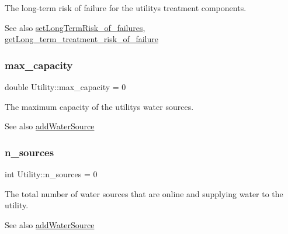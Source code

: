 The long-\/term risk of failure for the utility\textquotesingle{}s treatment components. 

\begin{DoxySeeAlso}{See also}
\mbox{\hyperlink{classUtility_a0a5ccfc2e606ef46f1c1a52707fb5071}{set\+Long\+Term\+Risk\+\_\+of\+\_\+failures}}, \mbox{\hyperlink{classUtility_aade5d5dc1ea04641ef9f709542848316}{get\+Long\+\_\+term\+\_\+treatment\+\_\+risk\+\_\+of\+\_\+failure}} 
\end{DoxySeeAlso}
\mbox{\label{classUtility_aa84826c0ff6f1a9836f52316a4e7e0cd}} 
\subsubsection{\texorpdfstring{max\+\_\+capacity}{max\_capacity}}
{\footnotesize\ttfamily double Utility\+::max\+\_\+capacity = 0\hspace{0.3cm}{\ttfamily [private]}}



The maximum capacity of the utility\textquotesingle{}s water sources. 

\begin{DoxySeeAlso}{See also}
\mbox{\hyperlink{classUtility_aebbfd65c13e86cfeda8bdfbcc6712587}{add\+Water\+Source}} 
\end{DoxySeeAlso}
\mbox{\label{classUtility_ac8ca6a82c340f78c539302dc87832a6e}} 
\subsubsection{\texorpdfstring{n\+\_\+sources}{n\_sources}}
{\footnotesize\ttfamily int Utility\+::n\+\_\+sources = 0\hspace{0.3cm}{\ttfamily [private]}}



The total number of water sources that are online and supplying water to the utility. 

\begin{DoxySeeAlso}{See also}
\mbox{\hyperlink{classUtility_aebbfd65c13e86cfeda8bdfbcc6712587}{add\+Water\+Source}} 
\end{DoxySeeAlso}
\mbox{\label{classUtility_ad0ce5c179a7f5ceb46d4fcae08dbfb47}} 

